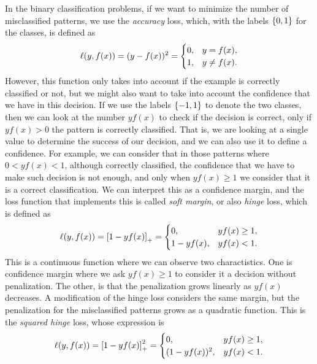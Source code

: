 In the binary classification problems, if we want to minimize the number of misclassified patterns, we use the \emph{accuracy} loss, which, with the labels $\left\{0, 1\right\}$ for the classes, is defined as
\begin{equation}
    \nonumber
    \ell(y, f(x)) = (y - f(x))^2 =
    \begin{cases}
        0, & y = f(x) ,\\
        1, & y \neq f(x) .
    \end{cases}
\end{equation}
However, this function only takes into account if the example is correctly classified or not, but we might also want to take into account the confidence that we have in this decision. If we use the labels $\left\{-1, 1\right\}$ to denote the two classes, then we can look at the number $y f(x)$ to check if the decision is correct, only if $y f(x) > 0$ the pattern is correctly classified. That is, we are looking at a single value to determine the success of our decision, and we can also use it to define a confidence. For example, we can consider that in those patterns where $0 < y f(x) < 1$, although correctly classified, the confidence that we have to make such decision is not enough, and only when $y f(x) \geq 1$ we consider that it is a correct classification. We can interpret this as a confidence margin, and the loss function that implements this is called \emph{soft margin}, or also \emph{hinge} loss, which is defined as
\begin{equation}
    \label{eq:hinge_def}
    \lossf(y, f(x)) = \pospart{1 - yf(x)} = 
    \begin{cases}
        0, & y f(x) \geq 1 ,\\
        1 - y f(x), & y f(x) < 1 .
    \end{cases}
\end{equation}
This is a continuous function where we can observe two charactistics. One is confidence margin where we ask $y f(x) \geq 1$ to consider it a decision without penalization. The other, is that the penalization grows linearly as $y f(x)$ decreases.
%
A modification of the hinge loss considers the same margin, but the penalization for the misclassified patterns grows as a quadratic function. This is the \emph{squared hinge} loss, whose expression is
\begin{equation}
    \label{eq:sqhinge_def}
    \lossf(y, f(x)) = \pospart{1 - yf(x)}^2 = 
    \begin{cases}
        0, & y f(x) \geq 1 ,\\
        (1 - y f(x))^2, & y f(x) < 1 .
    \end{cases}
\end{equation}

